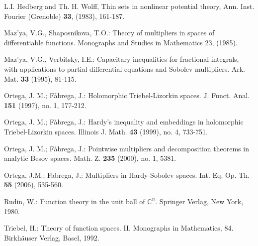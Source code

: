 \documentclass[12pt,twoside,leqno,final]{amsart}
\theoremstyle{plain}
\begin{document}
\begin{thebibliography}{12}
   L.I. Hedberg and Th. H. Wolff, 
  Thin sets in nonlinear potential theory,
 Ann. Inst. Fourier (Grenoble) \textbf{33}, (1983), 161-187.
 
   Maz'ya, V.G., Shaposnikova, T.O.: 
  Theory of multipliers in spaces of differentiable functions. 
  Monographs and Studies in Mathematics 23, (1985).
  
   Maz'ya, V.G., Verbitsky, I.E.: 
  Capacitary inequalities for fractional integrals, with applications to partial differential equations and Sobolev multipliers. 
  Ark. Mat. \textbf{33} (1995), 81-115.
  
   Ortega, J. M.; F\`abrega, J.:
 Holomorphic Triebel-Lizorkin spaces. 
J. Funct. Anal. \textbf{151} (1997), no. 1, 177-212.

  Ortega, J. M.; F\`abrega, J.: 
 Hardy's inequality and embeddings in holomorphic Triebel-Lizorkin spaces. 
 Illinois J. Math. \textbf{43} (1999), no. 4, 733-751.

  Ortega, J. M.; F\`abrega, J.:
  Pointwise multipliers and decomposition theorems in analytic Besov spaces. 
  Math. Z. \textbf{235} (2000), no. 1, 5381.

   Ortega, J.M.; Fabrega, J.: 
 Multipliers in Hardy-Sobolev spaces. 
 Int. Eq. Op. Th. \textbf{55} (2006),  535-560.
 
 
 Rudin, W.: 
Function theory in the unit ball of ${{\mathbb C}}^n$. 
Springer Verlag, New York, 1980.

 Triebel, H.:
 Theory of function spaces. II. 
 Monographs in Mathematics, 84. Birkhäuser Verlag, Basel, 1992.
 \end{thebibliography}
\end{document}
